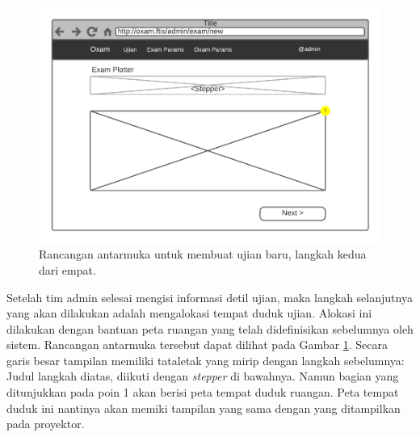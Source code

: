     
    \begin{figure}
        \centering
        \includegraphics{Gambar/mockups/Mockup--Admin - NewExam-Step 2.pdf}
        \caption{Rancangan antarmuka untuk membuat ujian baru, langkah kedua dari empat.}
        \label{fig:mockup_admin_exam_create-2}
    \end{figure}
    
    Setelah tim admin selesai mengisi informasi detil ujian, maka langkah
    selanjutnya yang akan dilakukan adalah mengalokasi tempat duduk ujian.
    Alokasi ini dilakukan dengan bantuan peta ruangan yang telah didefinisikan
    sebelumnya oleh sistem. Rancangan antarmuka tersebut dapat dilihat pada
    Gambar \ref{fig:mockup_admin_exam_create-2}. Secara garis besar tampilan
    memiliki tataletak yang mirip dengan langkah sebelumnya: Judul langkah
    diatas, diikuti dengan \textit{stepper} di bawahnya. Namun bagian yang
    ditunjukkan pada poin 1 akan berisi peta tempat duduk ruangan. Peta tempat
    duduk ini nantinya akan memiki tampilan yang sama dengan yang ditampilkan
    pada proyektor.
    
